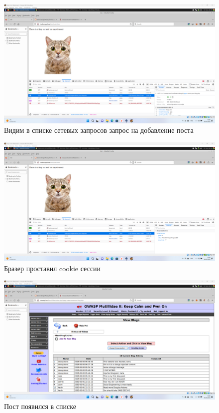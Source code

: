 \documentclass[a4paper]{article}
\begin{document}
  \begin{figure}[H]
    \centering
    \includegraphics[width=\textwidth]{Screenshot_77}
    \caption{Видим в списке сетевых запросов запрос на добавление поста}
  \end{figure}

  \begin{figure}[H]
    \centering
    \includegraphics[width=\textwidth]{Screenshot_78}
    \caption{Бразер проставил cookie сессии}
  \end{figure}

  \begin{figure}[H]
    \centering
    \includegraphics[width=\textwidth]{Screenshot_79}
    \caption{Пост появился в списке}
  \end{figure}
\end{document}
